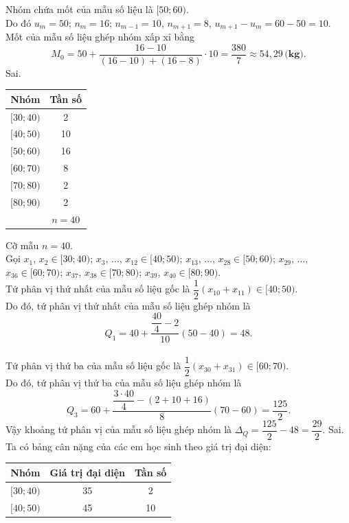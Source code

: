 \begin{ex}
{\begin{itemchoice}
			Nhóm chứa mốt của mẫu số liệu là $[50;60)$.\\
			Do đó $u_m=50$; $n_m=16$; $n_{m-1}=10$, $n_{m+1}=8$, $u_{m+1}-u_m=60-50=10$.\\
			Mốt của mẫu số liệu ghép nhóm xấp xỉ bằng
			$$M_0=50+\dfrac{16-10}{(16-10)+(16-8)} \cdot 10=\dfrac{380}{7} \approx 54{,}29\,\textbf{(kg).}$$ 
			\itemch Sai.
			\begin{center}
				\begin{tabular}{|c|c|}
					\hline
					Nhóm & Tần số \\
					\hline
					$[30; 40)$ & 2 \\
					\hline
					$[40; 50)$ & 10 \\
					\hline
					$[50; 60)$ & 16 \\
					\hline
					$[60; 70)$ & 8 \\
					\hline
					$[70; 80)$ & 2 \\
					\hline
					$[80; 90)$ & 2 \\
					\hline
					& $n=40$ \\
					\hline
				\end{tabular}
			\end{center}
			Cỡ mẫu $n=40$.\\
			Gọi
			$x_1$, $x_2\in[30;40)$; $x_3$, $\ldots$, $x_{12}\in[40; 50)$; $x_{13}$, $\ldots$, $x_{28}\in[50;60)$; $x_{29}$, $\ldots$, $x_{36}\in[60;70)$;
			$x_{37}$, $x_{38}\in[70;80)$; $x_{39}$, $x_{40}\in[80; 90)$.\\
			Tứ phân vị thứ nhất của mẫu số liệu gốc là $\dfrac{1}{2}\left(x_{10}+x_{11}\right)\in[40;50)$.\\
			Do đó, tứ phân vị thứ nhất của mẫu số liệu ghép nhóm là
			$$Q_1=40+\dfrac{\dfrac{40}{4}-2}{10}(50-40)=48.$$\\
			Tứ phân vị thứ ba của mẫu số liệu gốc là $\dfrac{1}{2}\left(x_{30}+x_{31}\right)\in[60;70)$.\\
			Do đó, tứ phân vị thứ ba của mẫu số liệu ghép nhóm là
			$$Q_3=60+\dfrac{\dfrac{3\cdot 40}{4}-(2+10+16)}{8}(70-60)=\dfrac{125}{2}.$$
			Vậy khoảng tứ phân vị của mẫu số liệu ghép nhóm là
			$\Delta_Q=\dfrac{125}{2}-48=\dfrac{29}{2}$.
			\itemch Sai. Ta có bảng cân nặng của các em học sinh theo giá trị đại diện:
			\begin{center}
				\begin{tabular}{|c|c|c|}
					\hline
					Nhóm & Giá trị đại diện & Tần số \\
					\hline
					$[30; 40)$ & 35 & 2 \\
					\hline
					$[40; 50)$ & 45 & 10 \\

\end{tabular}
\end{center}
\end{itemchoice}}
\end{ex}
